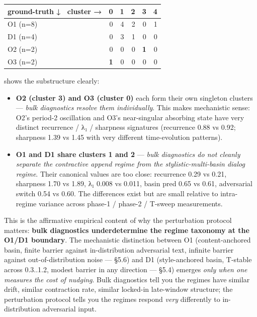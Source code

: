 \documentclass{article}
\theoremstyle{plain}
\theoremstyle{definition}
\begin{document}
\begin{table}[h!]
\centering
\small
\begin{tabular}{lrrrrr}
\toprule
ground-truth ↓ \ cluster → & 0 & 1 & 2 & 3 & 4 \\
\midrule
O1 (n=8) & 0 & 4 & 2 & 0 & 1 \\
D1 (n=4) & 0 & 3 & 1 & 0 & 0 \\
O2 (n=2) & 0 & 0 & 0 & \textbf{1} & 0 \\
O3 (n=2) & \textbf{1} & 0 & 0 & 0 & 0 \\
\bottomrule
\end{tabular}
\end{table}

shows the substructure clearly:

\begin{itemize}
  \item \textbf{O2 (cluster 3) and O3 (cluster 0)} each form their own
  singleton clusters — \textit{bulk diagnostics resolve them individually}.
  This makes mechanistic sense: O2's period-2 oscillation and O3's
  near-singular absorbing state have very distinct recurrence /
  λ₁ / sharpness signatures (recurrence 0.88 vs 0.92; sharpness 1.39
  vs 1.45 with very different time-evolution patterns).
  \item \textbf{O1 and D1 share clusters 1 and 2} — \textit{bulk diagnostics do not
  cleanly separate the contractive append regime from the
  stylistic-multi-basin dialog regime}. Their canonical values are
  too close: recurrence 0.29 vs 0.21, sharpness 1.70 vs 1.89,
  λ₁ 0.008 vs 0.011, basin pred 0.65 vs 0.61, adversarial switch
  0.54 vs 0.60. The differences exist but are small relative to
  intra-regime variance across phase-1 / phase-2 / T-sweep
  measurements.
\end{itemize}

This is the affirmative empirical content of why the perturbation
protocol matters: \textbf{bulk diagnostics underdetermine the regime
taxonomy at the O1/D1 boundary}. The mechanistic distinction
between O1 (content-anchored basin, finite barrier against
in-distribution adversarial text, infinite barrier against
out-of-distribution noise — §5.6) and D1 (style-anchored basin,
T-stable across {0.3..1.2}, modest barrier in any direction —
§5.4) emerges \textit{only when one measures the cost of nudging}. Bulk
diagnostics tell you the regimes have similar drift, similar
contraction rate, similar locked-in late-window structure; the
perturbation protocol tells you the regimes respond \textit{very}
differently to in-distribution adversarial input.
\end{document}
